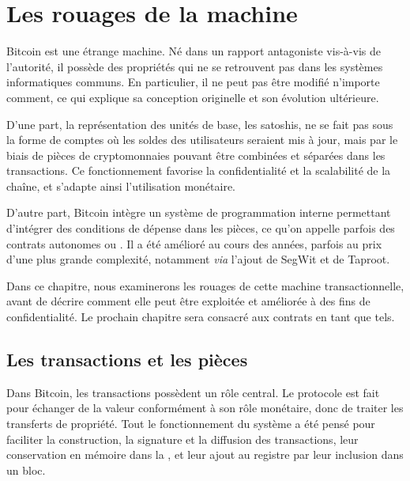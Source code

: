 
\chapter{Les rouages de la machine}
\label{ch:rouages} \label{enotezch:12}

Bitcoin est une étrange machine. Né dans un rapport antagoniste vis-à-vis de l'autorité, il possède des propriétés qui ne se retrouvent pas dans les systèmes informatiques communs. En particulier, il ne peut pas être modifié n'importe comment, ce qui explique sa conception originelle et son évolution ultérieure.

D'une part, la représentation des unités de base, les satoshis, ne se fait pas sous la forme de comptes où les soldes des utilisateurs seraient mis à jour, mais par le biais de pièces de cryptomonnaies pouvant être combinées et séparées dans les transactions. Ce fonctionnement favorise la confidentialité et la scalabilité de la chaîne, et s'adapte ainsi l'utilisation monétaire.

D'autre part, Bitcoin intègre un système de programmation interne permettant d'intégrer des conditions de dépense dans les pièces, ce qu'on appelle parfois des contrats autonomes ou . Il a été amélioré au cours des années, parfois au prix d'une plus grande complexité, notamment \emph{via} l'ajout de SegWit et de Taproot.

Dans ce chapitre, nous examinerons les rouages de cette machine transactionnelle, avant de décrire comment elle peut être exploitée et améliorée à des fins de confidentialité. Le prochain chapitre sera consacré aux contrats en tant que tels.

\section*{Les transactions et les pièces} %

Dans Bitcoin, les transactions possèdent un rôle central. Le protocole est fait pour échanger de la valeur conformément à son rôle monétaire, donc de traiter les transferts de propriété. Tout le fonctionnement du système a été pensé pour faciliter la construction, la signature et la diffusion des transactions, leur conservation en mémoire dans la , et leur ajout au registre par leur inclusion dans un bloc.

